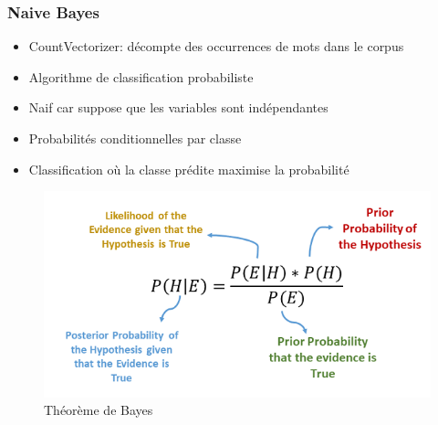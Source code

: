 \documentclass{beamer}
\begin{document}
\begin{frame}
\frametitle{Naive Bayes}
\begin{itemize}
    \item CountVectorizer: décompte des occurrences de mots dans le corpus
    \item Algorithme de classification probabiliste
    \item Naif car suppose que les variables sont indépendantes
    \item Probabilités conditionnelles par classe
    \item Classification où la classe prédite maximise la probabilité
\end{itemize}

\begin{figure}
    \begin{minipage}[b]{0.60\textwidth}
        \centering
        \includegraphics[width=\textwidth]{nb.png} 
        \caption{Théorème de Bayes}
    \end{minipage}
\end{figure}
\end{frame}
\end{document}
